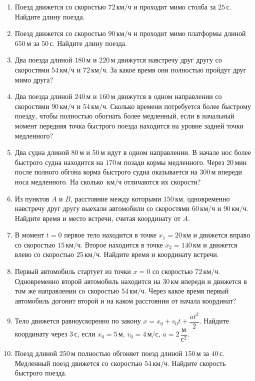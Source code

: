 \documentclass[a4paper,12pt]{article}
\newcommand{\unit}[1]{\,\text{#1}}
\begin{document}
\begin{enumerate}
\item Поезд движется со скоростью \(72\unit{км/ч}\) и проходит мимо столба за \(25\unit{с}\). Найдите длину поезда.

\item Поезд движется со скоростью \(90\unit{км/ч}\) и проходит мимо платформы длиной \(650\unit{м}\) за \(50\unit{с}\). Найдите длину поезда.

\item Два поезда длиной \(180\unit{м}\) и \(220\unit{м}\) движутся навстречу друг другу со скоростями \(54\unit{км/ч}\) и \(72\unit{км/ч}\). За какое время они полностью пройдут друг мимо друга?

\item Два поезда длиной \(240\unit{м}\) и \(160\unit{м}\) движутся в одном направлении со скоростями \(90\unit{км/ч}\) и \(54\unit{км/ч}\). Сколько времени потребуется более быстрому поезду, чтобы полностью обогнать более медленный, если в начальный момент передняя точка быстрого поезда находится на уровне задней точки медленного?

\item Два судна длиной \(80\unit{м}\) и \(50\unit{м}\) идут в одном направлении. В начале нос более быстрого судна находится на \(170\unit{м}\) позади кормы медленного. Через \(20\unit{мин}\) после полного обгона корма быстрого судна оказывается на \(300\unit{м}\) впереди носа медленного. На сколько \(\unit{км/ч}\) отличаются их скорости?

\item Из пунктов \(A\) и \(B\), расстояние между которыми \(150\unit{км}\), одновременно навстречу друг другу выехали автомобили со скоростями \(60\unit{км/ч}\) и \(90\unit{км/ч}\). Найдите время и место встречи, считая координату от \(A\).

\item В момент \(t=0\) первое тело находится в точке \(x_1=20\unit{км}\) и движется вправо со скоростью \(15\unit{км/ч}\). Второе находится в точке \(x_2=140\unit{км}\) и движется влево со скоростью \(25\unit{км/ч}\). Найдите время и координату встречи.

\item Первый автомобиль стартует из точки \(x=0\) со скоростью \(72\unit{км/ч}\). Одновременно второй автомобиль находится на \(30\unit{км}\) впереди и движется в том же направлении со скоростью \(54\unit{км/ч}\). Через какое время первый автомобиль догонит второй и на каком расстоянии от начала координат?

\item Тело движется равноускоренно по закону \(x=x_0+v_0t+\dfrac{at^2}{2}\). Найдите координату через \(3\unit{с}\), если \(x_0=5\unit{м}\), \(v_0=4\unit{м/с}\), \(a=2\,\dfrac{\text{м}}{\text{с}^2}\).

\item Поезд длиной \(250\unit{м}\) полностью обгоняет поезд длиной \(150\unit{м}\) за \(40\unit{с}\). Медленный поезд движется со скоростью \(54\unit{км/ч}\). Найдите скорость быстрого поезда.
\end{enumerate}
\end{document}
